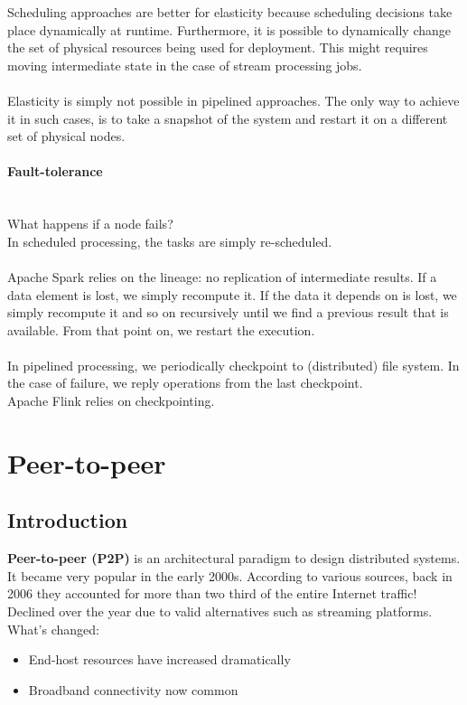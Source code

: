 \documentclass[10pt,a4paper]{article}
\newcommand{\myparagraph}[1]{\paragraph{#1}\mbox{}\\[0.05in]}
\begin{document}
Scheduling approaches are better for elasticity because scheduling decisions take place dynamically at runtime. Furthermore, it is possible to dynamically change the set of physical resources being used for deployment. This might requires moving intermediate state in the  case of stream processing jobs. \\ \\
Elasticity is simply not possible in pipelined approaches. The only way to achieve it in such cases, is to take a snapshot of the system and restart it on a different set of physical nodes.
\myparagraph{Fault-tolerance}
What happens if a node fails? \\ 
In scheduled processing, the tasks are simply re-scheduled. \\ \\
Apache Spark relies on the lineage: no replication of intermediate results. If a data element is lost, we simply recompute it. If the data it depends on is lost, we simply recompute it and so on recursively until we find a previous result that is available. From that point on, we restart the execution. \\ \\
In pipelined processing, we periodically checkpoint to (distributed) file system. In the case of failure, we reply operations from the last checkpoint. \\ Apache Flink relies on checkpointing.
\section{\LARGE Peer-to-peer}
\subsection{Introduction}
\textbf{Peer-to-peer (P2P)} is an architectural paradigm to design distributed systems. It became very popular in the early 2000s. According to various sources, back in 2006 they accounted for more than two third of the entire Internet traffic! Declined over the year due to valid alternatives such as streaming platforms. \\ What's changed:
\begin{itemize}
	\item End-host resources have increased dramatically
	\item Broadband connectivity now common
\end{itemize}
\end{document}
